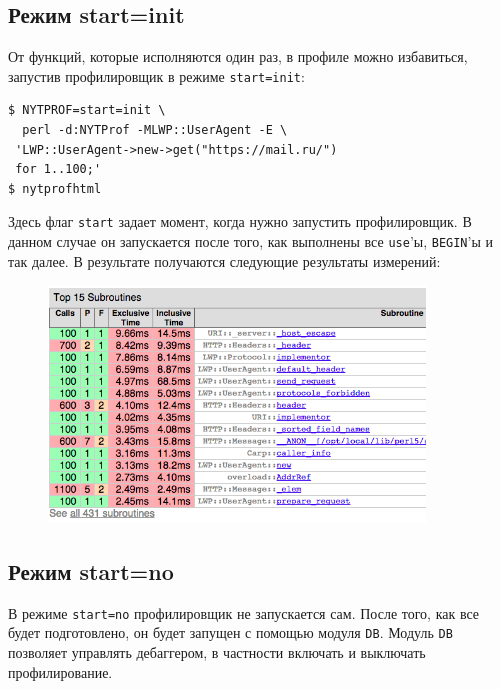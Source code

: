 \subsection{Режим start=init}
От функций, которые исполняются один раз, в профиле можно избавиться, запустив профилировщик в режиме \verb|start=init|:
\begin{verbatim}
$ NYTPROF=start=init \
  perl -d:NYTProf -MLWP::UserAgent -E \
 'LWP::UserAgent->new->get("https://mail.ru/")
 for 1..100;'
$ nytprofhtml
\end{verbatim}
Здесь флаг \verb|start| задает момент, когда нужно запустить профилировщик. В данном случае он запускается после того, как выполнены все \verb|use|'ы, \verb|BEGIN|'ы и так далее. В результате получаются следующие результаты измерений:
\begin{figure}[H] %
	\centering
	\includegraphics[width=10cm]{lectures/L12/nyt2.png}
\end{figure}

\subsection{Режим start=no}
В режиме \verb|start=no| профилировщик не запускается сам. После того, как все будет подготовлено, он будет запущен с помощью модуля \verb|DB|. Модуль \verb|DB| позволяет управлять дебаггером, в частности включать и выключать профилирование.

